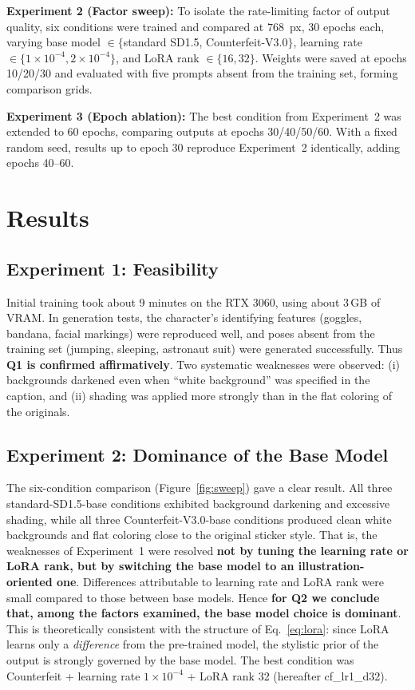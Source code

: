 \documentclass[10pt,twocolumn]{article}
\begin{document}
\textbf{Experiment 2 (Factor sweep):} To isolate the rate-limiting factor of output quality, six conditions were trained and compared at $768$~px, 30 epochs each, varying base model $\in\{$standard SD1.5, Counterfeit-V3.0$\}$, learning rate $\in\{1\!\times\!10^{-4}, 2\!\times\!10^{-4}\}$, and LoRA rank $\in\{16,32\}$. Weights were saved at epochs 10/20/30 and evaluated with five prompts absent from the training set, forming comparison grids.

\textbf{Experiment 3 (Epoch ablation):} The best condition from Experiment~2 was extended to 60 epochs, comparing outputs at epochs 30/40/50/60. With a fixed random seed, results up to epoch 30 reproduce Experiment~2 identically, adding epochs 40--60.

\section{Results}
\subsection{Experiment 1: Feasibility}
Initial training took about 9 minutes on the RTX 3060, using about 3\,GB of VRAM. In generation tests, the character's identifying features (goggles, bandana, facial markings) were reproduced well, and poses absent from the training set (jumping, sleeping, astronaut suit) were generated successfully. Thus \textbf{Q1 is confirmed affirmatively}. Two systematic weaknesses were observed: (i) backgrounds darkened even when ``white background'' was specified in the caption, and (ii) shading was applied more strongly than in the flat coloring of the originals.

\subsection{Experiment 2: Dominance of the Base Model}
The six-condition comparison (Figure~\ref{fig:sweep}) gave a clear result. All three standard-SD1.5-base conditions exhibited background darkening and excessive shading, while all three Counterfeit-V3.0-base conditions produced clean white backgrounds and flat coloring close to the original sticker style. That is, the weaknesses of Experiment~1 were resolved \textbf{not by tuning the learning rate or LoRA rank, but by switching the base model to an illustration-oriented one}. Differences attributable to learning rate and LoRA rank were small compared to those between base models. Hence \textbf{for Q2 we conclude that, among the factors examined, the base model choice is dominant}. This is theoretically consistent with the structure of Eq.~\eqref{eq:lora}: since LoRA learns only a \emph{difference} from the pre-trained model, the stylistic prior of the output is strongly governed by the base model. The best condition was Counterfeit + learning rate $1\!\times\!10^{-4}$ + LoRA rank 32 (hereafter cf\_lr1\_d32).
\end{document}
